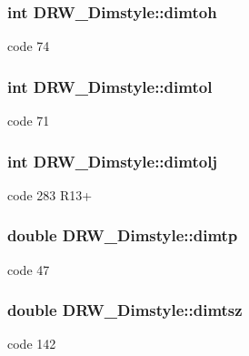 \subsubsection[{dimtoh}]{\setlength{\rightskip}{0pt plus 5cm}int D\+R\+W\+\_\+\+Dimstyle\+::dimtoh}\label{class_d_r_w___dimstyle_a1b18fcdd37b17dda1613d19b3302c7b1}
code 74 \hypertarget{class_d_r_w___dimstyle_a68bc1acdadaa4511180645a648c911a1}{}
\subsubsection[{dimtol}]{\setlength{\rightskip}{0pt plus 5cm}int D\+R\+W\+\_\+\+Dimstyle\+::dimtol}\label{class_d_r_w___dimstyle_a68bc1acdadaa4511180645a648c911a1}
code 71 \hypertarget{class_d_r_w___dimstyle_a0aff1bb2b68293702729f84e751bea0a}{}
\subsubsection[{dimtolj}]{\setlength{\rightskip}{0pt plus 5cm}int D\+R\+W\+\_\+\+Dimstyle\+::dimtolj}\label{class_d_r_w___dimstyle_a0aff1bb2b68293702729f84e751bea0a}
code 283 R13+ \hypertarget{class_d_r_w___dimstyle_a6596806a922534a220ce3b7f7b4bb415}{}
\subsubsection[{dimtp}]{\setlength{\rightskip}{0pt plus 5cm}double D\+R\+W\+\_\+\+Dimstyle\+::dimtp}\label{class_d_r_w___dimstyle_a6596806a922534a220ce3b7f7b4bb415}
code 47 \hypertarget{class_d_r_w___dimstyle_a4b8018caf9bdf34b2002efce8929dc57}{}
\subsubsection[{dimtsz}]{\setlength{\rightskip}{0pt plus 5cm}double D\+R\+W\+\_\+\+Dimstyle\+::dimtsz}\label{class_d_r_w___dimstyle_a4b8018caf9bdf34b2002efce8929dc57}
code 142 \hypertarget{class_d_r_w___dimstyle_a002065c5911ff94712dd7d688b886883}{}
